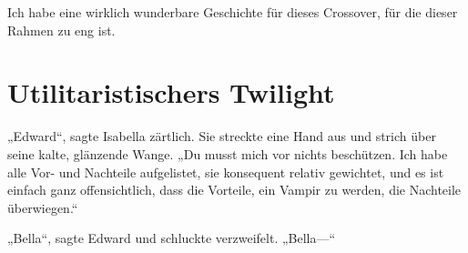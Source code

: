 Ich habe eine wirklich wunderbare Geschichte für dieses Crossover, für die dieser Rahmen zu eng ist.

\section{Utilitaristischers Twilight\protect\footnotemark}

„Edward“, sagte Isabella zärtlich. Sie streckte eine Hand aus und strich über seine kalte, glänzende Wange. „Du musst mich vor nichts beschützen. Ich habe alle Vor- und Nachteile aufgelistet, sie konsequent relativ gewichtet, und es ist einfach ganz offensichtlich, dass die Vorteile, ein Vampir zu werden, die Nachteile überwiegen.“

„Bella“, sagte Edward und schluckte verzweifelt. „Bella—“

